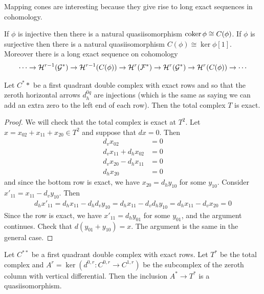 \documentclass[12pt]{article}
\begin{document}
Mapping cones are interesting because they give rise to long exact sequences in cohomology.
\begin{lemma}
    If $\phi$ is injective then there is a natural quasiisomorphism $\operatorname{coker}\phi\cong C(\phi)$.
    If $\phi$ is surjective then there is a natural quasiisomorphism $C(\phi)\cong \ker\phi[1]$.
    Moreover there is a long exact sequence on cohomology \begin{align*}
        \cdots \to {\mathcal{H}}^{r-1}({\mathcal{G}}^*) \to {\mathcal{H}}^{r-1}(C(\phi)) \to {\mathcal{H}}^r({\mathcal{F}}^*) \to {\mathcal{H}}^r({\mathcal{G}}^*) \to {\mathcal{H}}^r(C(\phi)) \to \cdots
    \end{align*}
\end{lemma}

\begin{lemma}
    Let $C^**$ be a first quadrant double complex with exact rows and so that the zeroth
    horizontal arrows $d_h^{0q}$ are injections (which is the same as saying we 
    can add an extra zero to the left end of each row). Then the total complex
    $T$ is exact.
\end{lemma}

\begin{proof}
    We will check that the total complex is exact at $T^2$. Let $x = x_{02} + x_{11} + x_{20} \in T^2$
    and suppose that $dx = 0$. Then \begin{align*}
        d_v x_{02} &= 0 \\
        d_vx_{11} + d_hx_{02} &= 0 \\
        d_vx_{20} - d_hx_{11} &= 0 \\
        d_hx_{20} &= 0
    \end{align*} and since the bottom row is exact, we have $x_{20} = d_hy_{10}$ for some $y_{10}$.
    Consider $x'_{11} = x_{11} - d_vy_{10}$. Then \begin{align*}
        d_hx'_{11} = d_hx_{11} - d_hd_vy_{10} = d_hx_{11} - d_vd_hy_{10} = d_hx_{11} - d_vx_{20} = 0
    \end{align*} Since the row is exact, we have $x'_{11} = d_hy_{01}$ for some $y_{01}$,
    and the argument continues. Check that $d(y_{01} + y_{10}) = x$. The 
    argument is the same in the general case. 
\end{proof}

\begin{corollary}
    Let $C^{**}$ be a first quadrant double complex with exact rows. Let $T^*$
    be the total complex and $A^r = \ker(d^{0,r}:C^{0,r}\to C^{1,r})$ be the subcomplex of the zeroth 
    column with vertical differential. Then the inclusion $A^* \to T^*$ is a quasiisomorphism.
\end{corollary}
\end{document}
